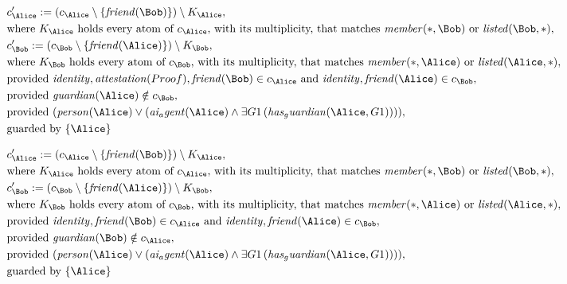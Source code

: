 \begin{align*}
&
c'_
{
\Alice
}
 := 
(c_
{
\Alice
}
 \setminus 
\{
\mathit{
friend
}
(
\Bob
)
\}
) \setminus K_
{
\Alice
}
,\\
&
\text{where } K_
{
\Alice
}
 \text{ holds every atom of } c_
{
\Alice
}
 \text{, with its multiplicity, that matches } 
\mathit{
member
}
(
\ast
,
\Bob
)
 \text{ or } 
\mathit{
listed
}
(
\Bob
,
\ast
)
,\\
&
c'_
{
\Bob
}
 := 
(c_
{
\Bob
}
 \setminus 
\{
\mathit{
friend
}
(
\Alice
)
\}
) \setminus K_
{
\Bob
}
,\\
&
\text{where } K_
{
\Bob
}
 \text{ holds every atom of } c_
{
\Bob
}
 \text{, with its multiplicity, that matches } 
\mathit{
member
}
(
\ast
,
\Alice
)
 \text{ or } 
\mathit{
listed
}
(
\Alice
,
\ast
)
,\\
&
\text{provided } 
\mathit{
identity
}
,
\mathit{
attestation
}
(
Proof
)
,
\mathit{
friend
}
(
\Bob
)
 \in c_
{
\Alice
}
 \text{ and } 
\mathit{
identity
}
,
\mathit{
friend
}
(
\Alice
)
 \in c_
{
\Bob
}
,\\
&
\text{provided } 
\mathit{
guardian
}
(
\Alice
)
 \notin c_
{
\Bob
}
,\\
&
\text{provided } 
(
\mathit{
person
}
(
\Alice
)
\lor
(
\mathit{
ai_agent
}
(
\Alice
)
\land
\exists 
G1
\,(
\mathit{
has_guardian
}
(
\Alice
,
G1
)
)
)
)
,\\
&
\text{guarded by } \{
\Alice
\}
\end{align*}

\begin{align*}
&
c'_
{
\Alice
}
 := 
(c_
{
\Alice
}
 \setminus 
\{
\mathit{
friend
}
(
\Bob
)
\}
) \setminus K_
{
\Alice
}
,\\
&
\text{where } K_
{
\Alice
}
 \text{ holds every atom of } c_
{
\Alice
}
 \text{, with its multiplicity, that matches } 
\mathit{
member
}
(
\ast
,
\Bob
)
 \text{ or } 
\mathit{
listed
}
(
\Bob
,
\ast
)
,\\
&
c'_
{
\Bob
}
 := 
(c_
{
\Bob
}
 \setminus 
\{
\mathit{
friend
}
(
\Alice
)
\}
) \setminus K_
{
\Bob
}
,\\
&
\text{where } K_
{
\Bob
}
 \text{ holds every atom of } c_
{
\Bob
}
 \text{, with its multiplicity, that matches } 
\mathit{
member
}
(
\ast
,
\Alice
)
 \text{ or } 
\mathit{
listed
}
(
\Alice
,
\ast
)
,\\
&
\text{provided } 
\mathit{
identity
}
,
\mathit{
friend
}
(
\Bob
)
 \in c_
{
\Alice
}
 \text{ and } 
\mathit{
identity
}
,
\mathit{
friend
}
(
\Alice
)
 \in c_
{
\Bob
}
,\\
&
\text{provided } 
\mathit{
guardian
}
(
\Bob
)
 \notin c_
{
\Alice
}
,\\
&
\text{provided } 
(
\mathit{
person
}
(
\Alice
)
\lor
(
\mathit{
ai_agent
}
(
\Alice
)
\land
\exists 
G1
\,(
\mathit{
has_guardian
}
(
\Alice
,
G1
)
)
)
)
,\\
&
\text{guarded by } \{
\Alice
\}
\end{align*}
